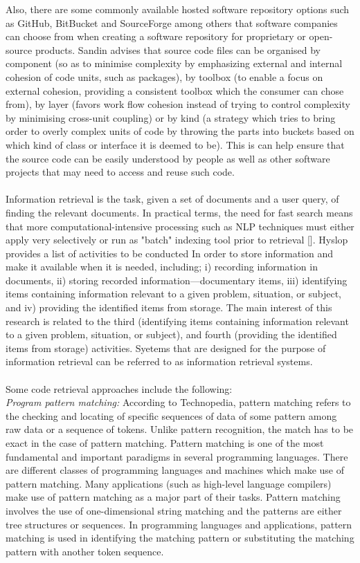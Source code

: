 \documentclass[a4paper]{article}
\begin{document}
Also, there are some commonly available hosted software repository options such as GitHub, BitBucket and SourceForge among others that software companies can choose from when creating a software repository for proprietary or open-source products. Sandin advises that source code files can be organised by component (so as to minimise complexity by emphasizing external and internal cohesion of code units, such as packages), by toolbox (to enable a focus on external cohesion, providing a consistent toolbox which the consumer can chose from), by layer (favors work flow cohesion instead of trying to control complexity by minimising cross-unit coupling) or by kind (a strategy which tries to bring order to overly complex units of code by throwing the parts into buckets based on which kind of class or interface it is deemed to be). This is can help ensure that the source code can be easily understood by people as well as other software projects that may need to access and reuse such code. \\ \\
Information retrieval is the task, given a set of documents and a user query, of finding the relevant documents.  In practical terms, the need for fast search means that more computational-intensive processing such as NLP techniques must either apply very selectively or run as "batch" indexing tool prior to retrieval []. Hyslop provides a list of activities to be conducted In order to store information and make it available when it is needed,  including; i) recording information in documents, ii) storing recorded information—documentary items, iii) identifying items containing information relevant to a given problem, situation, or subject, and iv) providing the identified items from storage. The main interest of this research is related to the third (identifying items containing information relevant to a given problem, situation, or subject), and fourth (providing the identified items from storage) activities. Syetems that are designed for the purpose of information retrieval can be referred to as information retrieval systems. \\ \\
Some code retrieval approaches include the following: \\
\textit{Program pattern matching:}
According to Technopedia, pattern matching refers to the checking and locating of specific sequences of data of some pattern among raw data or a sequence of tokens. Unlike pattern recognition, the match has to be exact in the case of pattern matching. Pattern matching is one of the most fundamental and important paradigms in several programming languages. There are different classes of programming languages and machines which make use of pattern matching. Many applications (such as high-level language compilers) make use of pattern matching as a major part of their tasks. Pattern matching involves the use of one-dimensional string matching and the patterns are either tree structures or sequences.  In programming languages and applications, pattern matching is used in identifying the matching pattern or substituting the matching pattern with another token sequence. \\ \\
\end{document}
